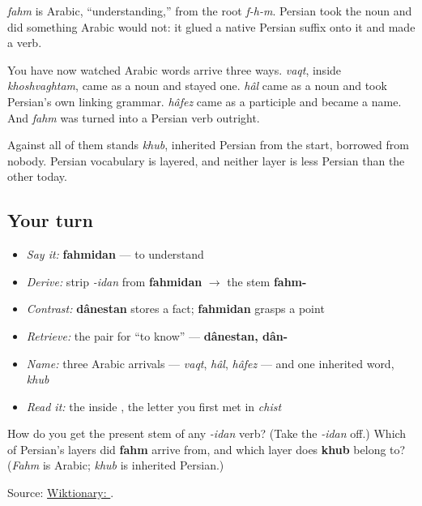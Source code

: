 \begin{cousinweb}
\textbf{} \emph{fahm} is Arabic, “understanding,” from the root \emph{f-h-m}. Persian took the noun and did something Arabic would not: it glued a native Persian suffix onto it and made a verb.

You have now watched Arabic words arrive three ways. \emph{vaqt}, inside \emph{khoshvaghtam}, came as a noun and stayed one. \emph{hâl} came as a noun and took Persian's own linking grammar. \emph{hâfez} came as a participle and became a name. And \textbf{} \emph{fahm} was turned into a Persian verb outright.

Against all of them stands \emph{khub}, inherited Persian from the start, borrowed from nobody. Persian vocabulary is layered, and neither layer is less Persian than the other today.
\end{cousinweb}

\subsection*{Your turn}
\begin{itemize}
\raggedright
  \item \emph{Say it:} \textbf{fahmidan} — to understand
  \item \emph{Derive:} strip \emph{-idan} from \textbf{fahmidan} $\to$ the stem \textbf{fahm-}
  \item \emph{Contrast:} \textbf{dânestan} stores a fact; \textbf{fahmidan} grasps a point
  \item \emph{Retrieve:} the pair for “to know” — \textbf{dânestan, dân-}
  \item \emph{Name:} three Arabic arrivals — \emph{vaqt}, \emph{hâl}, \emph{hâfez} — and one inherited word, \emph{khub}
  \item \emph{Read it:} the \textbf{} inside \textbf{}, the letter you first met in \emph{chist}
\end{itemize}

\begin{tcolorbox}[breakable,colback=teal!4,colframe=teal!35!black,title={Before you move on}]
How do you get the present stem of any \emph{-idan} verb? (Take the \emph{-idan} off.) Which of Persian's layers did \textbf{fahm} arrive from, and which layer does \textbf{khub} belong to? (\emph{Fahm} is Arabic; \emph{khub} is inherited Persian.)

Source: \href{https://en.wiktionary.org/wiki/\%D9\%81\%D9\%87\%D9\%85\%DB\%8C\%D8\%AF\%D9\%86}{Wiktionary: }.
\end{tcolorbox}
